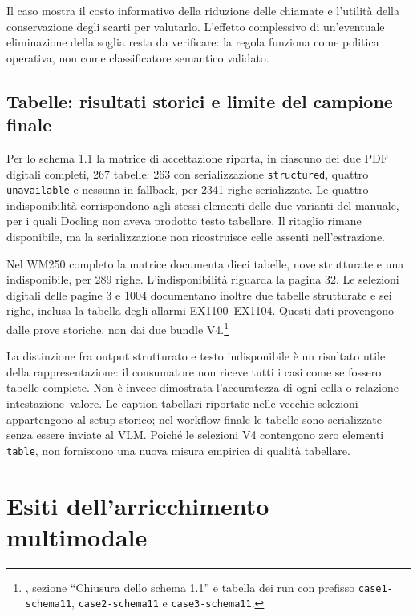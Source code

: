 

Il caso mostra il costo informativo della riduzione delle chiamate e l'utilità della conservazione degli scarti per valutarlo. L'effetto complessivo di un'eventuale eliminazione della soglia resta da verificare: la regola funziona come politica operativa, non come classificatore semantico validato.

\subsection{Tabelle: risultati storici e limite del campione finale}

Per lo schema 1.1 la matrice di accettazione riporta, in ciascuno dei due PDF digitali completi, 267 tabelle: 263 con serializzazione \texttt{structured}, quattro \texttt{unavailable} e nessuna in fallback, per 2341 righe serializzate. Le quattro indisponibilità corrispondono agli stessi elementi delle due varianti del manuale, per i quali Docling non aveva prodotto testo tabellare. Il ritaglio rimane disponibile, ma la serializzazione non ricostruisce celle assenti nell'estrazione.

Nel WM250 completo la matrice documenta dieci tabelle, nove strutturate e una indisponibile, per 289 righe. L'indisponibilità riguarda la pagina 32. Le selezioni digitali delle pagine 3 e 1004 documentano inoltre due tabelle strutturate e sei righe, inclusa la tabella degli allarmi EX1100--EX1104. Questi dati provengono dalle prove storiche, non dai due bundle V4.\footnote{, sezione ``Chiusura dello schema 1.1'' e tabella dei run con prefisso \texttt{case1-schema11}, \texttt{case2-schema11} e \texttt{case3-schema11}.}

La distinzione fra output strutturato e testo indisponibile è un risultato utile della rappresentazione: il consumatore non riceve tutti i casi come se fossero tabelle complete. Non è invece dimostrata l'accuratezza di ogni cella o relazione intestazione--valore. Le caption tabellari riportate nelle vecchie selezioni appartengono al setup storico; nel workflow finale le tabelle sono serializzate senza essere inviate al VLM. Poiché le selezioni V4 contengono zero elementi \texttt{table}, non forniscono una nuova misura empirica di qualità tabellare.

\section{Esiti dell'arricchimento multimodale}
\label{sec:risultati-enrichment}

